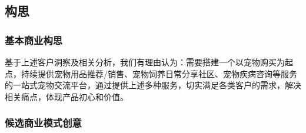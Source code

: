 \documentclass[a4paper]{ctexart}
\begin{document}
\subsection{构思}

\subsubsection{基本商业构思}

基于上述客户洞察及相关分析，我们有理由认为：需要搭建一个以宠物购买为起点，持续提供宠物用品推荐/销售、宠物饲养日常分享社区、宠物疾病咨询等服务的一站式宠物交流平台，通过提供上述多种服务，切实满足各类客户的需求，解决相关痛点，体现产品初心和价值。

\subsubsection{候选商业模式创意}
\end{document}
